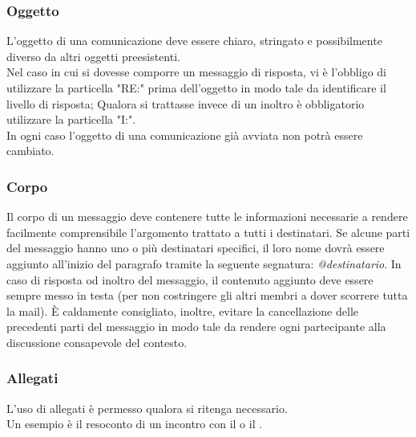         \subsubsection{Oggetto}
          L'oggetto di una comunicazione deve essere chiaro, stringato e possibilmente diverso da altri oggetti preesistenti.\\
          Nel caso in cui si dovesse comporre un messaggio di risposta, vi è l'obbligo di utilizzare la particella "RE:" prima dell'oggetto in modo tale da identificare
          il livello di risposta; Qualora si trattasse invece di un inoltro è obbligatorio utilizzare la particella "I:".\\
          In ogni caso l'oggetto di una comunicazione già avviata non potrà essere cambiato.
        \subsubsection{Corpo}
          Il corpo di un messaggio deve contenere tutte le informazioni necessarie a rendere facilmente comprensibile l’argomento trattato a tutti i destinatari. Se alcune parti del messaggio hanno uno o più destinatari specifici, il loro nome dovrà essere aggiunto all’inizio del paragrafo tramite la seguente segnatura: \emph{@destinatario}.
          In caso di risposta od inoltro del messaggio, il contenuto aggiunto deve essere sempre messo in testa (per non costringere gli altri membri a dover scorrere tutta la mail).
          È caldamente consigliato, inoltre, evitare la cancellazione delle precedenti parti del messaggio in modo tale da rendere ogni partecipante alla discussione consapevole del contesto.
        \subsubsection{Allegati}
          L'uso di allegati è permesso qualora si ritenga necessario.\\
          Un esempio è il resoconto di un incontro con il  o il .
